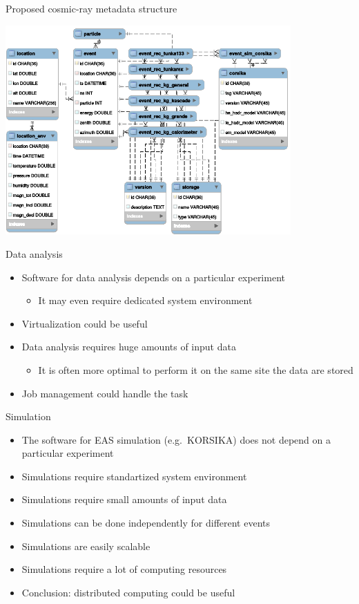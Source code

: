 \documentclass[18pt]{beamer}
\newcommand{\concl}[1]{\item[\scriptsize\raise1.25pt\hbox{\textcolor{kit-green100}{$\blacktriangleright$}}]\textcolor{kit-green100}{#1}}
\begin{document}
\begin{frame}{Proposed cosmic-ray metadata structure}
\begin{center}
\includegraphics[width=0.82\textwidth]{pics/metadata.eps}
\end{center}
\end{frame}

\begin{frame}{Data analysis}
\begin{itemize}
  \item Software for data analysis depends on a particular experiment
  \begin{itemize}
    \item It may even require dedicated system environment
  \end{itemize}
  \concl{Virtualization could be useful}
  \item Data analysis requires huge amounts of input data
  \begin{itemize}
    \item It is often more optimal to perform it on the same site the data are stored
  \end{itemize}
  \concl{Job management could handle the task}
\end{itemize}
\end{frame}

\begin{frame}{Simulation}
\begin{itemize}
  \item The software for EAS simulation (e.g.\ KORSIKA) does not depend on a particular experiment
  \concl{Simulations require standartized system environment}
  \item Simulations require small amounts of input data
  \item Simulations can be done independently for different events
  \concl{Simulations are easily scalable}
  \item Simulations require a lot of computing resources
  \concl{Conclusion: distributed computing could be useful}
\end{itemize}
\end{frame}
\end{document}
